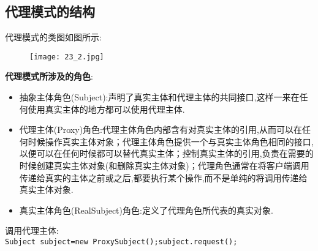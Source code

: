 \documentclass[../main.tex]{subfiles}
\begin{document}
\subsection{代理模式的结构}
代理模式的类图如图所示:
%
\begin{figure}[H]
  \texttt{[image: 23\_2.jpg]}
\end{figure}
%
\textbf{代理模式所涉及的角色}:
\begin{itemize}
  \item 抽象主体角色(Subject):声明了真实主体和代理主体的共同接口,这样一来在任何使用真实主体的地方都可以使用代理主体.
  \item 代理主体(Proxy)角色:代理主体角色内部含有对真实主体的引用,从而可以在任何时候操作真实主体对象；代理主体角色提供一个与真实主体角色相同的接口,以便可以在任何时候都可以替代真实主体；控制真实主体的引用,负责在需要的时候创建真实主体对象(和删除真实主体对象)；代理角色通常在将客户端调用传递给真实的主体之前或之后,都要执行某个操作,而不是单纯的将调用传递给真实主体对象.
  \item 真实主体角色(RealSubject)角色:定义了代理角色所代表的真实对象.
\end{itemize}
%



%
调用代理主体: \\
\texttt{Subject subject=new ProxySubject();subject.request();}
\end{document}
